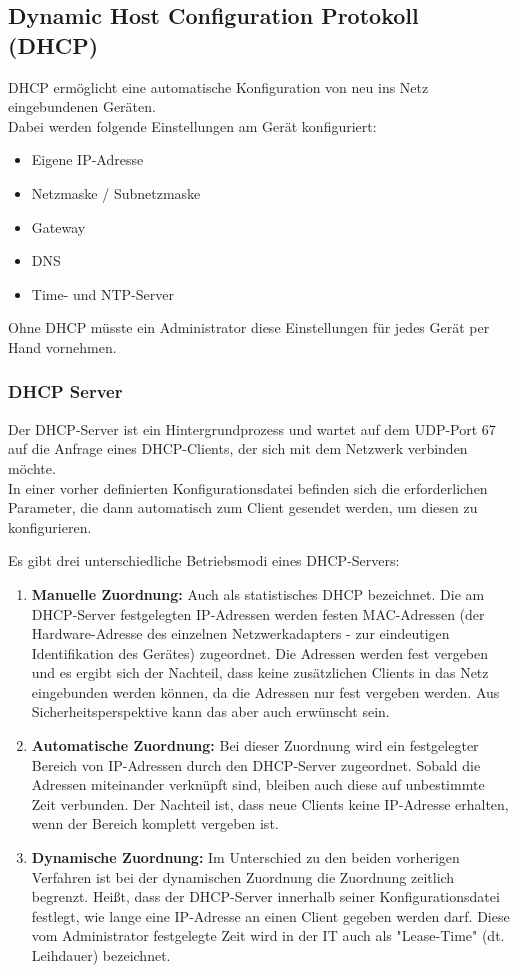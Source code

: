 \documentclass[asp1.tex]{subfiles}
\begin{document}
\subsection{Dynamic Host Configuration Protokoll (DHCP)}

DHCP ermöglicht eine automatische Konfiguration von neu ins Netz eingebundenen Geräten.\\
Dabei werden folgende Einstellungen am Gerät konfiguriert:

\begin{itemize}
    \item Eigene IP-Adresse
    \item Netzmaske / Subnetzmaske
    \item Gateway
    \item DNS
    \item Time- und NTP-Server
\end{itemize}

Ohne DHCP müsste ein Administrator diese Einstellungen für jedes Gerät per Hand vornehmen.

\subsubsection{DHCP Server}
Der DHCP-Server ist ein Hintergrundprozess und wartet auf dem UDP-Port 67 auf die Anfrage eines DHCP-Clients, der sich mit dem Netzwerk verbinden möchte.\\
In einer vorher definierten Konfigurationsdatei befinden sich die erforderlichen Parameter, die dann automatisch zum Client gesendet werden, um diesen zu konfigurieren.

Es gibt drei unterschiedliche Betriebsmodi eines DHCP-Servers:

\begin{enumerate}
    \item \textbf{Manuelle Zuordnung: }Auch als statistisches DHCP bezeichnet. Die am DHCP-Server festgelegten IP-Adressen werden festen MAC-Adressen (der Hardware-Adresse des einzelnen Netzwerkadapters - zur eindeutigen Identifikation des Gerätes) zugeordnet. Die Adressen werden fest vergeben und es ergibt sich der Nachteil, dass keine zusätzlichen Clients in das Netz eingebunden werden können, da die Adressen nur fest vergeben werden. Aus Sicherheitsperspektive kann das aber auch erwünscht sein.
    \item \textbf{Automatische Zuordnung:} Bei dieser Zuordnung wird ein festgelegter Bereich von IP-Adressen durch den DHCP-Server zugeordnet. Sobald die Adressen miteinander verknüpft sind, bleiben auch diese auf unbestimmte Zeit verbunden. Der Nachteil ist, dass neue Clients keine IP-Adresse erhalten, wenn der Bereich komplett vergeben ist.
    \item \textbf{Dynamische Zuordnung:} Im Unterschied zu den beiden vorherigen Verfahren ist bei der dynamischen Zuordnung die Zuordnung zeitlich begrenzt. Heißt, dass der DHCP-Server innerhalb seiner Konfigurationsdatei festlegt, wie lange eine IP-Adresse an einen Client gegeben werden darf. Diese vom Administrator festgelegte Zeit wird in der IT auch als "Lease-Time" (dt. Leihdauer) bezeichnet.
\end{enumerate}
\end{document}
